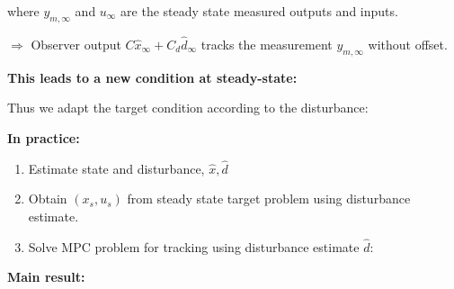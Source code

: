 \documentclass[8pt,a4paper]{scrartcl}
\begin{document}
\begin{multicols*}{3}
\begin{multicols*}{4}


where $y_{m,\infty}$ and $u_\infty$ are the steady state measured outputs and inputs.

$\Rightarrow$ Observer output $C\hat{x}_\infty+C_d\hat{d}_\infty$ tracks the measurement $y_{m,\infty}$ without offset.

\finn

\textbf{This leads to a new condition at steady-state:}


Thus we adapt the target condition according to the disturbance:


\textbf{In practice:}

\begin{enumerate}

\item Estimate state and disturbance, $\hat{x},\hat{d}$
\item Obtain $(x_s,u_s)$ from steady state target problem using disturbance estimate.
\item Solve MPC problem for tracking using disturbance estimate $\hat{d}$:
\end{enumerate}


\textbf{Main result:}

\finn


\end{multicols*}
\end{multicols*}
\end{document}
